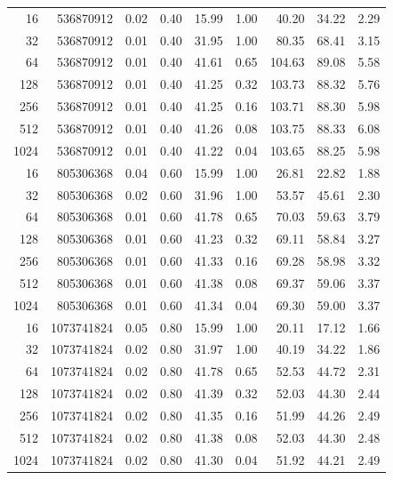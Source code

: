 \begin{table}[H]
\begin{adjustbox}{width=\textwidth, keepaspectratio}
\begin{tabular}{rrrrrrrrr}
                    16 & 536870912 & 0.02 & 0.40 & 15.99 & 1.00 & 40.20 & 34.22 & 2.29 \\
                    32 & 536870912 & 0.01 & 0.40 & 31.95 & 1.00 & 80.35 & 68.41 & 3.15 \\
                    64 & 536870912 & 0.01 & 0.40 & 41.61 & 0.65 & 104.63 & 89.08 & 5.58 \\
                    128 & 536870912 & 0.01 & 0.40 & 41.25 & 0.32 & 103.73 & 88.32 & 5.76 \\
                    256 & 536870912 & 0.01 & 0.40 & 41.25 & 0.16 & 103.71 & 88.30 & 5.98 \\
                    512 & 536870912 & 0.01 & 0.40 & 41.26 & 0.08 & 103.75 & 88.33 & 6.08 \\
                    1024 & 536870912 & 0.01 & 0.40 & 41.22 & 0.04 & 103.65 & 88.25 & 5.98 \\
                   
                    16 & 805306368 & 0.04 & 0.60 & 15.99 & 1.00 & 26.81 & 22.82 & 1.88 \\
                    32 & 805306368 & 0.02 & 0.60 & 31.96 & 1.00 & 53.57 & 45.61 & 2.30 \\
                    64 & 805306368 & 0.01 & 0.60 & 41.78 & 0.65 & 70.03 & 59.63 & 3.79 \\
                    128 & 805306368 & 0.01 & 0.60 & 41.23 & 0.32 & 69.11 & 58.84 & 3.27 \\
                    256 & 805306368 & 0.01 & 0.60 & 41.33 & 0.16 & 69.28 & 58.98 & 3.32 \\
                    512 & 805306368 & 0.01 & 0.60 & 41.38 & 0.08 & 69.37 & 59.06 & 3.37 \\
                    1024 & 805306368 & 0.01 & 0.60 & 41.34 & 0.04 & 69.30 & 59.00 & 3.37 \\
                   
                    16 & 1073741824 & 0.05 & 0.80 & 15.99 & 1.00 & 20.11 & 17.12 & 1.66 \\
                    32 & 1073741824 & 0.02 & 0.80 & 31.97 & 1.00 & 40.19 & 34.22 & 1.86 \\
                    64 & 1073741824 & 0.02 & 0.80 & 41.78 & 0.65 & 52.53 & 44.72 & 2.31 \\
                    128 & 1073741824 & 0.02 & 0.80 & 41.39 & 0.32 & 52.03 & 44.30 & 2.44 \\
                    256 & 1073741824 & 0.02 & 0.80 & 41.35 & 0.16 & 51.99 & 44.26 & 2.49 \\
                    512 & 1073741824 & 0.02 & 0.80 & 41.38 & 0.08 & 52.03 & 44.30 & 2.48 \\
                    1024 & 1073741824 & 0.02 & 0.80 & 41.30 & 0.04 & 51.92 & 44.21 & 2.49 \\
                    

\end{tabular}
\end{adjustbox}
\end{table}
